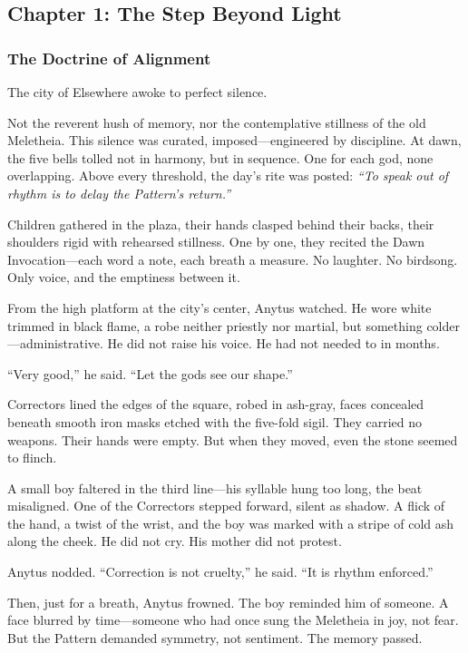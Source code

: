 \documentclass[12pt]{article}
\begin{document}
\newpage

\subsection{Chapter 1: The Step Beyond Light}

\vspace{.5in}

\subsubsection{The Doctrine of Alignment}

The city of Elsewhere awoke to perfect silence.

Not the reverent hush of memory, nor the contemplative stillness of the old Meletheia. This silence was curated, imposed—engineered by discipline. At dawn, the five bells tolled not in harmony, but in sequence. One for each god, none overlapping. Above every threshold, the day's rite was posted: \textit{“To speak out of rhythm is to delay the Pattern’s return.”}

Children gathered in the plaza, their hands clasped behind their backs, their shoulders rigid with rehearsed stillness. One by one, they recited the Dawn Invocation—each word a note, each breath a measure. No laughter. No birdsong. Only voice, and the emptiness between it.

From the high platform at the city’s center, Anytus watched. He wore white trimmed in black flame, a robe neither priestly nor martial, but something colder—administrative. He did not raise his voice. He had not needed to in months.

“Very good,” he said. “Let the gods see our shape.”

Correctors lined the edges of the square, robed in ash-gray, faces concealed beneath smooth iron masks etched with the five-fold sigil. They carried no weapons. Their hands were empty. But when they moved, even the stone seemed to flinch.

A small boy faltered in the third line—his syllable hung too long, the beat misaligned. One of the Correctors stepped forward, silent as shadow. A flick of the hand, a twist of the wrist, and the boy was marked with a stripe of cold ash along the cheek. He did not cry. His mother did not protest.

Anytus nodded. “Correction is not cruelty,” he said. “It is rhythm enforced.”

Then, just for a breath, Anytus frowned. The boy reminded him of someone. A face blurred by time—someone who had once sung the Meletheia in joy, not fear. But the Pattern demanded symmetry, not sentiment. The memory passed.
\end{document}
